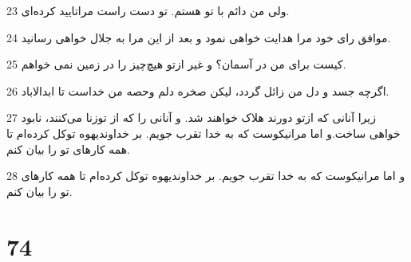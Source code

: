 \par 23 ولی من دائم با تو هستم. تو دست راست مراتایید کرده‌ای.
\par 24 موافق رای خود مرا هدایت خواهی نمود و بعد از این مرا به جلال خواهی رسانید.
\par 25 کیست برای من در آسمان؟ و غیر ازتو هیچ‌چیز را در زمین نمی خواهم.
\par 26 اگرچه جسد و دل من زائل گردد، لیکن صخره دلم وحصه من خداست تا ابدالاباد.
\par 27 زیرا آنانی که ازتو دورند هلاک خواهند شد. و آنانی را که از توزنا می‌کنند، نابود خواهی ساخت.و اما مرانیکوست که به خدا تقرب جویم. بر خداوندیهوه توکل کرده‌ام تا همه کارهای تو را بیان کنم.
\par 28 و اما مرانیکوست که به خدا تقرب جویم. بر خداوندیهوه توکل کرده‌ام تا همه کارهای تو را بیان کنم.
 
\chapter{74}

